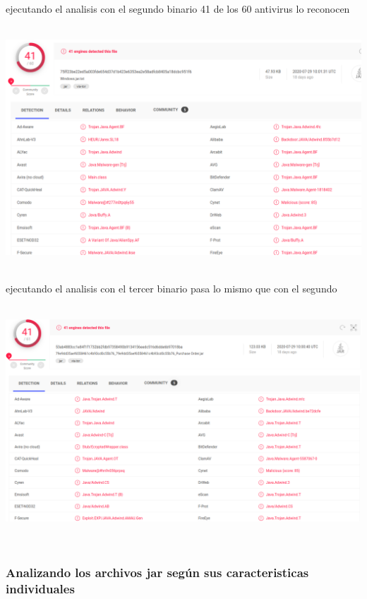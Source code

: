 \documentclass[10pt,a4paper]{article} %
\begin{document}
                    \\
                    \\ ejecutando el analisis con el segundo binario 41 de los 60 antivirus lo reconocen

                    \\ 
                    \includegraphics[width=0.5\linewidth]{purchase.png}

                    \\ ejecutando el analisis con el tercer binario pasa lo mismo que con el segundo 

                    \\ \includegraphics[width=0.5\linewidth]{purchase2.png}

                    \\ 

                \subsubsection{Analizando los archivos jar según sus caracteristicas individuales}
\end{document}
